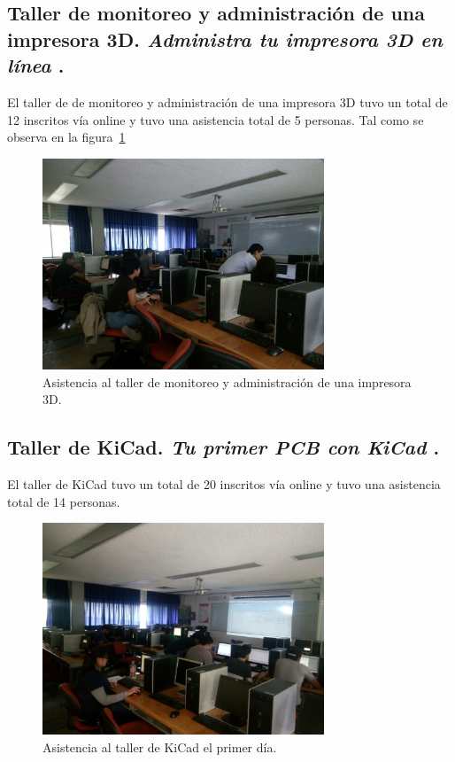 \documentclass[a4paper,11pt]{article}                 %
\begin{document}
  \subsection{Taller de monitoreo y administración de una impresora 3D. \textit{Administra tu impresora 3D en línea} .}   
  
El taller de de monitoreo y administración de una impresora 3D tuvo un total de 12 inscritos vía online y tuvo una asistencia total de 5 personas. Tal como se observa en la figura~\ref{fig:impresion-01}
       \begin{figure}[H]
    \begin{center}
      \includegraphics[width=0.75\textwidth]{images/impresion-01}
      \caption{Asistencia al taller de monitoreo y administración de una impresora 3D.}
      \label{fig:impresion-01}
    \end{center}
  \end{figure}
  
  \subsection{Taller de KiCad. \textit{ Tu primer PCB con KiCad} .}  
    El taller de KiCad tuvo un total de 20 inscritos vía online y tuvo una asistencia total de 14 personas.
       \begin{figure}[H]
    \begin{center}
      \includegraphics[width=0.75\textwidth]{images/kicad-01}
      \caption{Asistencia al taller de KiCad el primer día.}
      \label{fig:kicad-01}
    \end{center}
  \end{figure}   
  
\end{document}
